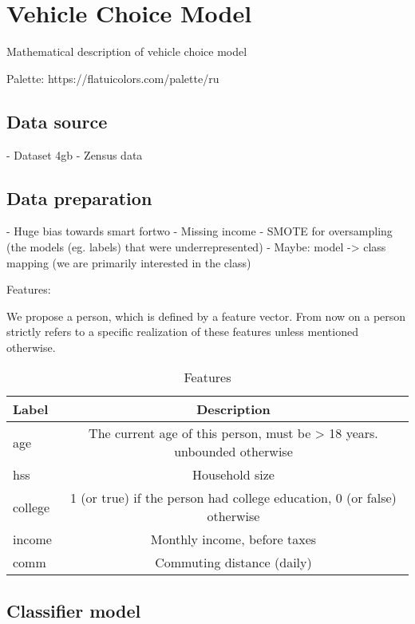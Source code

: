 \clearpage
\section{Vehicle Choice Model}
\label{sec:ChoiceModel}

Mathematical description of vehicle choice model

Palette: https://flatuicolors.com/palette/ru

\subsection{Data source}
\label{sub_sec:DataSource}

- Dataset 4gb
- Zensus data


\subsection{Data preparation}
\label{sub_sec:DataPreparation}

- Huge bias towards smart fortwo
- Missing income
- SMOTE for oversampling (the models (eg. labels) that were underrepresented)
- Maybe: model -> class mapping (we are primarily interested in the class)


Features:

We propose a person, which is defined by a feature vector. From now on a person strictly refers to a specific realization 
of these features unless mentioned otherwise. 

\begin{longtable}{l | c}
  \caption{Features}
  \label{table:features}
  \\
  \textbf{Label} & \textbf{Description} \\
  \hline
  age & The current age of this person, must be > 18 years. unbounded otherwise \\
  hss & Household size\\
  college & 1 (or true) if the person had college education, 0 (or false) otherwise \\
  income & Monthly income, before taxes \\
  comm & Commuting distance (daily)
\end{longtable}


\subsection{Classifier model}
\label{sub_sec:Classifier}

